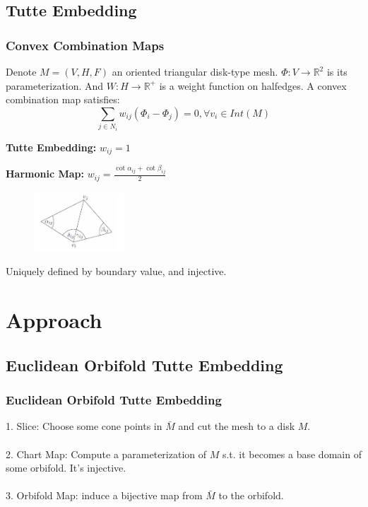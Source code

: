 \documentclass{beamer}
\begin{document}
\subsection{Tutte Embedding}
\begin{frame}
\frametitle{Convex Combination Maps}
Denote $M = (V, H, F)$ an oriented triangular disk-type mesh. $\Phi: V\rightarrow \mathbb{R}^2$ is its parameterization. And $W: H\rightarrow \mathbb{R}^+$ is a weight function on halfedges. A convex combination map satisfies:
$$ \sum_{j\in N_i} w_{ij}(\Phi_i - \Phi_j) = 0, \forall v_i \in Int(M)$$

\textbf{Tutte Embedding:} $w_{ij} = 1$

\textbf{Harmonic Map:} $w_{ij} = \frac{\cot \alpha_{ij} + \cot \beta_{ij}}{2}$ 

\begin{figure}
\centering
\includegraphics[width = 0.3\textwidth]{images/harmonic}
\end{figure}
Uniquely defined by boundary value, and injective.
\end{frame}



\section{Approach}
\subsection{Euclidean Orbifold Tutte Embedding}
\begin{frame}
\frametitle{Euclidean Orbifold Tutte Embedding}
1. Slice: Choose some cone points in $\bar{M}$ and cut the mesh to a disk $M$.\\
~\\
2. Chart Map: Compute a parameterization of $M$ s.t. it becomes a base domain of some orbifold. It's injective.\\
~\\
3. Orbifold Map: induce a bijective map from $\bar{M}$ to the orbifold.
\end{frame}
\end{document}
